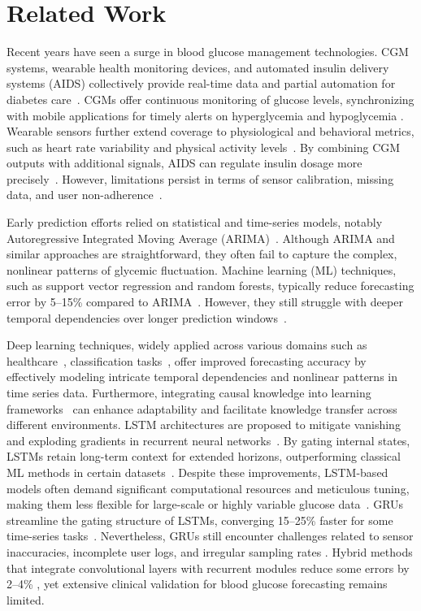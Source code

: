 \section{Related Work}

Recent years have seen a surge in blood glucose management technologies. CGM systems, wearable health monitoring devices, and automated insulin delivery systems (AIDS) collectively provide real-time data and partial automation for diabetes care~\cite{WHO2024Diabetes, pasquel2021management}. CGMs offer continuous monitoring of glucose levels, synchronizing with mobile applications for timely alerts on hyperglycemia and hypoglycemia \cite{abdul2020epidemiology}. Wearable sensors further extend coverage to physiological and behavioral metrics, such as heart rate variability and physical activity levels~\cite{raffin2023sedentary, guan2023artificial}. By combining CGM outputs with additional signals, AIDS can regulate insulin dosage more precisely~\cite{lovic2020growing}. However, limitations persist in terms of sensor calibration, missing data, and user non-adherence~\cite{pasquel2021management}.


Early prediction efforts relied on statistical and time-series models, notably Autoregressive Integrated Moving Average (ARIMA)~\cite{xie2020benchmarking}. Although ARIMA and similar approaches are straightforward, they often fail to capture the complex, nonlinear patterns of glycemic fluctuation. Machine learning (ML) techniques, such as support vector regression and random forests, typically reduce forecasting error by 5--15\% compared to ARIMA~\cite{xie2020benchmarking, mujahid2021machine}. However, they still struggle with deeper temporal dependencies over longer prediction windows~\cite{mujahid2021machine}.

Deep learning techniques, widely applied across various domains such as healthcare~\cite{azghan2023personalized,mamun2022multimodal,10857973}, classification tasks~\cite{10780662}, offer improved forecasting accuracy by effectively modeling intricate temporal dependencies and nonlinear patterns in time series data. Furthermore, integrating causal knowledge into learning frameworks~\cite{corazza2023expediting,10644549} can enhance adaptability and facilitate knowledge transfer across different environments. LSTM architectures are proposed to mitigate vanishing and exploding gradients in recurrent neural networks~\cite{ shuvo2023deep}. By gating internal states, LSTMs retain long-term context for extended horizons, outperforming classical ML methods in certain datasets~\cite{shuvo2023deep}. Despite these improvements, LSTM-based models often demand significant computational resources and meticulous tuning, making them less flexible for large-scale or highly variable glucose data~\cite{kong2024unlocking}.
GRUs streamline the gating structure of LSTMs, converging 15--25\% faster for some time-series tasks~\cite{chung2014empirical, Elsayed_2019}. Nevertheless, GRUs still encounter challenges related to sensor inaccuracies, incomplete user logs, and irregular sampling rates \cite{kong2024unlocking}. Hybrid methods that integrate convolutional layers with recurrent modules reduce some errors by 2--4\% \cite{Elsayed_2019}, yet extensive clinical validation for blood glucose forecasting remains limited.

